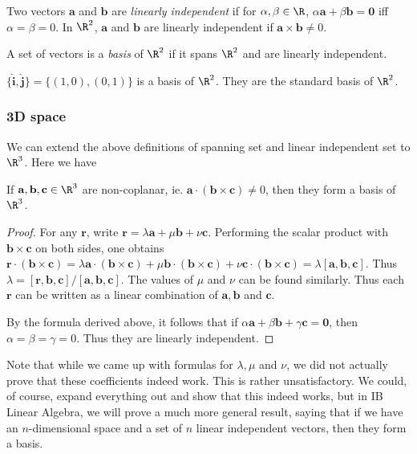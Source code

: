 \documentclass[a4paper]{article}
\begin{document}
\begin{defi}
  Two vectors $\mathbf{a}$ and $\mathbf{b}$ are \emph{linearly independent} if for $\alpha, \beta\in \R$, $\alpha\mathbf{a} + \beta\mathbf{b} = \mathbf{0}$ iff $\alpha = \beta = 0$. In $\R^2$, $\mathbf{a}$ and $\mathbf{b}$ are linearly independent if $\mathbf{a\times b} \not= 0$.
\end{defi}

\begin{defi}[Basis of $\R^2$]
  A set of vectors is a \emph{basis} of $\R^2$ if it spans $\R^2$ and are linearly independent.
\end{defi}

\begin{eg}
  $\{\hat{\mathbf{i}}, \hat{\mathbf{j}}\} = \{(1, 0), (0, 1)\}$ is a basis of $\R^2$. They are the standard basis of $\R^2$.
\end{eg}

\subsubsection{3D space}
We can extend the above definitions of spanning set and linear independent set to $\R^3$. Here we have
\begin{thm}
  If $\mathbf{a}, \mathbf{b}, \mathbf{c}\in\R^3$ are non-coplanar, ie. $\mathbf{a}\cdot(\mathbf{b}\times \mathbf{c})\not= 0$, then they form a basis of $\R^3$.
\end{thm}

\begin{proof}
  For any $\mathbf{r}$, write $\mathbf{r} = \lambda\mathbf{a} + \mu\mathbf{b} + \nu\mathbf{c}$. Performing the scalar product with $\mathbf{b\times c}$ on both sides, one obtains $\mathbf{r\cdot(b\times c)} = \lambda \mathbf{a\cdot(b\times c)} + \mu\mathbf{b\cdot (b\times c)} + \nu\mathbf{c\cdot(b\times c)} = \lambda \mathbf{[a, b, c]}$. Thus $\lambda = \mathbf{[r, b, c]/[a,b, c]}$. The values of $\mu$ and $\nu$ can be found similarly. Thus each $\mathbf{r}$ can be written as a linear combination of $\mathbf{a}, \mathbf{b}$ and $\mathbf{c}$.

  By the formula derived above, it follows that if $\alpha\mathbf{a} + \beta\mathbf{b} + \gamma\mathbf{c} = \mathbf{0}$, then $\alpha = \beta = \gamma = 0$. Thus they are linearly independent.
\end{proof}
Note that while we came up with formulas for $\lambda, \mu$ and $\nu$, we did not actually prove that these coefficients indeed work. This is rather unsatisfactory. We could, of course, expand everything out and show that this indeed works, but in IB Linear Algebra, we will prove a much more general result, saying that if we have an $n$-dimensional space and a set of $n$ linear independent vectors, then they form a basis.
\end{document}
